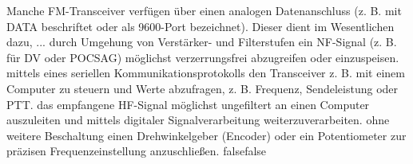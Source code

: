     {Manche FM-Transceiver verfügen über einen analogen Datenanschluss (z. B. mit DATA beschriftet oder als 9600-Port bezeichnet). Dieser dient im Wesentlichen dazu, ...}
    {durch Umgehung von Verstärker- und Filterstufen ein NF-Signal (z. B. für DV oder POCSAG) möglichst verzerrungsfrei abzugreifen oder einzuspeisen.}
    {mittels eines seriellen Kommunikationsprotokolls den Transceiver z. B. mit einem Computer zu steuern und Werte abzufragen, z. B. Frequenz, Sendeleistung oder PTT.}
    {das empfangene HF-Signal möglichst ungefiltert an einen Computer auszuleiten und mittels digitaler Signalverarbeitung weiterzuverarbeiten.}
    {ohne weitere Beschaltung einen Drehwinkelgeber (Encoder) oder ein Potentiometer zur präzisen Frequenzeinstellung anzuschließen.}
    {false}{false}